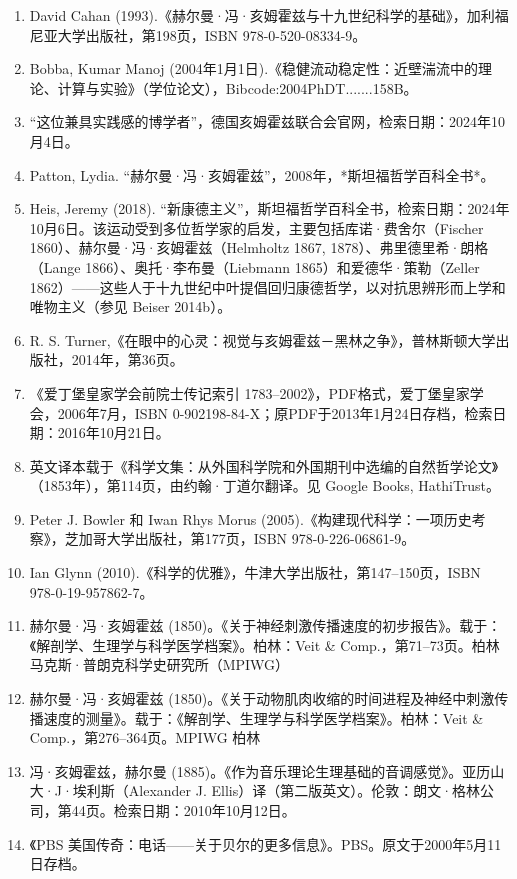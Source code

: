 \begin{enumerate}
\item David Cahan (1993).《赫尔曼·冯·亥姆霍兹与十九世纪科学的基础》，加利福尼亚大学出版社，第198页，ISBN 978-0-520-08334-9。
\item Bobba, Kumar Manoj (2004年1月1日).《稳健流动稳定性：近壁湍流中的理论、计算与实验》（学位论文），Bibcode:2004PhDT.......158B。
\item “这位兼具实践感的博学者”，德国亥姆霍兹联合会官网，检索日期：2024年10月4日。
\item Patton, Lydia. “赫尔曼·冯·亥姆霍兹”，2008年，*斯坦福哲学百科全书*。
\item Heis, Jeremy (2018). “新康德主义”，斯坦福哲学百科全书，检索日期：2024年10月6日。该运动受到多位哲学家的启发，主要包括库诺·费舍尔（Fischer 1860）、赫尔曼·冯·亥姆霍兹（Helmholtz 1867, 1878）、弗里德里希·朗格（Lange 1866）、奥托·李布曼（Liebmann 1865）和爱德华·策勒（Zeller 1862）——这些人于十九世纪中叶提倡回归康德哲学，以对抗思辨形而上学和唯物主义（参见 Beiser 2014b）。
\item R. S. Turner,《在眼中的心灵：视觉与亥姆霍兹－黑林之争》，普林斯顿大学出版社，2014年，第36页。
\item 《爱丁堡皇家学会前院士传记索引 1783–2002》，PDF格式，爱丁堡皇家学会，2006年7月，ISBN 0-902198-84-X；原PDF于2013年1月24日存档，检索日期：2016年10月21日。
\item 英文译本载于《科学文集：从外国科学院和外国期刊中选编的自然哲学论文》（1853年），第114页，由约翰·丁道尔翻译。见 Google Books, HathiTrust。
\item Peter J. Bowler 和 Iwan Rhys Morus (2005).《构建现代科学：一项历史考察》，芝加哥大学出版社，第177页，ISBN 978-0-226-06861-9。
\item Ian Glynn (2010).《科学的优雅》，牛津大学出版社，第147–150页，ISBN 978-0-19-957862-7。
\item 赫尔曼·冯·亥姆霍兹 (1850)。《关于神经刺激传播速度的初步报告》。载于：《解剖学、生理学与科学医学档案》。柏林：Veit & Comp.，第71–73页。柏林马克斯·普朗克科学史研究所（MPIWG）
\item 赫尔曼·冯·亥姆霍兹 (1850)。《关于动物肌肉收缩的时间进程及神经中刺激传播速度的测量》。载于：《解剖学、生理学与科学医学档案》。柏林：Veit & Comp.，第276–364页。MPIWG 柏林
\item 冯·亥姆霍兹，赫尔曼 (1885)。《作为音乐理论生理基础的音调感觉》。亚历山大·J·埃利斯（Alexander J. Ellis）译（第二版英文）。伦敦：朗文·格林公司，第44页。检索日期：2010年10月12日。
\item 《PBS 美国传奇：电话——关于贝尔的更多信息》。PBS。原文于2000年5月11日存档。

\end{enumerate}

